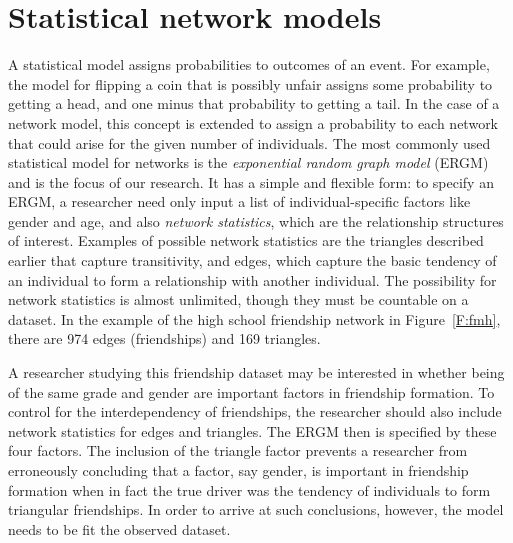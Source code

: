 \documentclass[12pt]{article}
\begin{document}
\section{Statistical network models}
A statistical model assigns probabilities to outcomes of an event.  For example, 
the model for flipping a coin that is possibly unfair assigns some 
probability to getting a head, and one minus that probability to getting a tail.  
In the case of a network model, this concept is  
extended to assign a probability to each network that could 
arise for the given number of individuals.
The most commonly used statistical model for networks is the 
\textit{exponential random graph model} (ERGM) 
\citep{Wasserman:1996,Pattison:1999,logit,Snijders:2002,introp*,ergm} and 
is the focus of our research.  It has a simple and flexible form:
to specify an ERGM, a researcher need only input a list of 
individual-specific factors like gender and age, and also \textit{network statistics}, 
which are the relationship structures of interest.  Examples of possible network statistics are the triangles described earlier that capture
transitivity, and edges, which capture the basic tendency of an individual to
 form a relationship with another individual.  The possibility for network statistics
 is almost unlimited, 
though they must be countable on a dataset. 
In the example of the high school friendship network in Figure~\ref{F:fmh},
there are 974 edges (friendships) and 169 triangles.

A researcher studying this friendship dataset may be interested in whether being of the same grade and gender
 are important factors in friendship formation.
To control for the interdependency of friendships, the 
researcher should also include network statistics for edges and triangles.
The ERGM then is specified by these four factors.
The inclusion of the triangle factor
prevents a researcher from erroneously concluding
that a factor, say gender, is important in friendship formation when in 
fact the true driver was the tendency of individuals to form
triangular friendships.  In order to arrive at 
such conclusions, however, the model needs to be fit the observed dataset.
\end{document}
